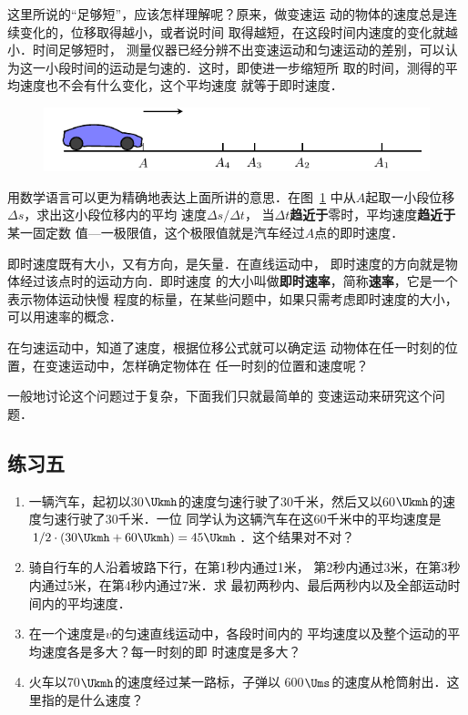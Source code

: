 这里所说的“足够短”，应该怎样理解呢？原来，做变速运
动的物体的速度总是连续变化的，位移取得越小，或者说时间
取得越短，在这段时间内速度的变化就越小．时间足够短时，
测量仪器已经分辨不出变速运动和匀速运动的差别，可以认
为这一小段时间的运动是匀速的．这时，即使进一步缩短所
取的时间，测得的平均速度也不会有什么变化，这个平均速度
就等于即时速度．

\begin{figure}[htp]
    \centering
    \includegraphics{fig/A/2-14.pdf}
    \caption{}\label{fig_A_2-14}
\end{figure}

用数学语言可以更为精确地表达上面所讲的意思．在图~\ref{fig_A_2-14} 
中从$A$起取一小段位移$\Delta s$，求出这小段位移内的平均
速度$\Delta s/\Delta t$， 当$\Delta t$\textbf{趋近于}零时，平均速度\textbf{趋近于}某一固定数
值—一极限值，这个极限值就是汽车经过$A$点的即时速度．

    即时速度既有大小，又有方向，是矢量．在直线运动中，
即时速度的方向就是物体经过该点时的运动方向．即时速度
的大小叫做\textbf{即时速率}，简称\textbf{速率}，它是一个表示物体运动快慢
程度的标量，在某些问题中，如果只需考虑即时速度的大小，
可以用速率的概念．

    在匀速运动中，知道了速度，根据位移公式就可以确定运
动物体在任一时刻的位置，在变速运动中，怎样确定物体在
任一时刻的位置和速度呢？

    一般地讨论这个问题过于复杂，下面我们只就最简单的
变速运动来研究这个问题．

\subsection*{练习五}

\begin{enumerate}
    \item 一辆汽车，起初以30$\Ukmh$的速度匀速行驶了30千米，然后又以60$\Ukmh$的速度匀速行驶了30千米．一位
    同学认为这辆汽车在这60千米中的平均速度是$1/2\cdot(30 \Ukmh+60\Ukmh)=45\Ukmh$．这个结果对不对？
    \item 骑自行车的人沿着坡路下行，在第1秒内通过1米，
    第2秒内通过3米，在第3秒内通过5米，在第4秒内通过7米．求
    最初两秒内、最后两秒内以及全部运动时间内的平均速度．
    \item 在一个速度是$v$的匀速直线运动中，各段时间内的
    平均速度以及整个运动的平均速度各是多大？每一时刻的即
    时速度是多大？
    \item 火车以70$\Ukmh$的速度经过某一路标，子弹以
    600$\Ums$的速度从枪筒射出．这里指的是什么速度？
    
\end{enumerate}


